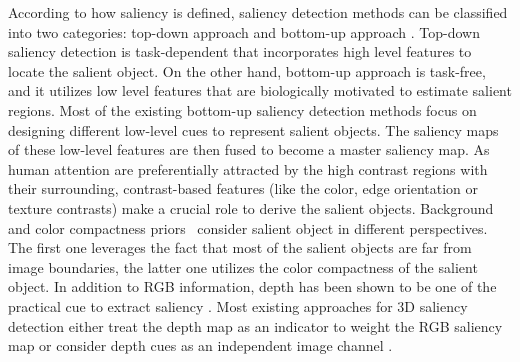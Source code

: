 \documentclass[journal]{IEEEtran}
\begin{document}
According to how saliency is defined, saliency detection methods can be classified into two categories: top-down approach and bottom-up approach \cite{itti1998model,ma2003contrast}. Top-down saliency detection is task-dependent that incorporates high level features to locate the salient object. On the other hand, bottom-up approach is task-free, and it utilizes low level features that are biologically motivated to estimate salient regions. Most of the existing bottom-up saliency detection methods focus on designing different low-level cues to represent salient objects. The saliency maps of these low-level features are then fused to become a master saliency map. As human attention are preferentially attracted by the high contrast regions with their surrounding, contrast-based features (like the color, edge orientation or texture contrasts) make a crucial role to derive the salient objects. Background \cite{wei2012geodesic} and color compactness priors~\cite{keyang2013} consider salient object in different perspectives. The first one leverages the fact that most of the salient objects are far from image boundaries, the latter one utilizes the color compactness of the salient object. In addition to RGB information, depth has been shown to be one of the practical cue to extract saliency \cite{maki1996computational,lang2012depth,desingh2013depth,zhang2010stereoscopic}. Most existing approaches for 3D saliency detection either treat the depth map as an indicator to weight the RGB saliency map \cite{maki1996computational,zhang2010stereoscopic} or consider depth cues as an independent image channel \cite{lang2012depth,desingh2013depth}.
\end{document}

